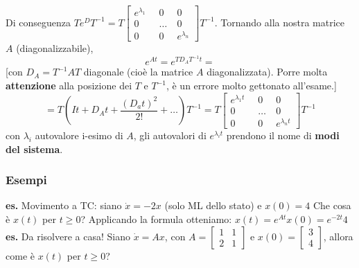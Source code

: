 Di conseguenza $T e^{D}T^{-1} = T \left[\begin{matrix}
    e^{\lambda_1} \;\; &0 \;\; &0\\
    0 & \dots &0\\
    0 &0 & e^{\lambda_n}
\end{matrix}\right] T^{-1}$.\newline
Tornando alla nostra matrice $A$ (diagonalizzabile), 
\[
    e^{At}= e^{TD_AT^{-1}t} =
\] 
[con $D_A = T^{-1} A T$ diagonale (cioè la matrice $A$ diagonalizzata). Porre molta \textbf{attenzione} alla posizione dei $T$ e $T^{-1}$, è un errore molto gettonato all'esame.]
\[
    = T(It + D_A t + \frac{(D_at)^2}{2!} + \dots)T^{-1} =  T \left[\begin{matrix}
        e^{\lambda_1t} \;\; &0 \;\; &0\\
        0 & \dots &0\\
        0 &0 & e^{\lambda_nt}
    \end{matrix}\right]T^{-1}
\] con $\lambda_i$ autovalore i-esimo di $A$, gli autovalori di $e^{\lambda_it}$ prendono il nome di \textbf{modi del sistema}.
\subsubsection{Esempi}
\textbf{es.} Movimento a TC:\newline
siano\newline
$\dot{x} = -2x$ (solo ML dello stato) e $x(0) = 4$\newline
Che cosa è $x(t)$ per $t\geq 0$?\newline
Applicando la formula otteniamo: $x(t) = e^{At}x(0) = e^{-2t}4$\newline
\newline
\textbf{es.} Da risolvere a casa!\newline
Siano $\dot{x} = Ax$, con $A = \left[\begin{matrix}
    1&1\\
    2&1
\end{matrix}\right]$ e $x(0) = \left[\begin{matrix}
    3\\
    4
\end{matrix}\right]$, allora come è $x(t)$ per $t\geq 0$?